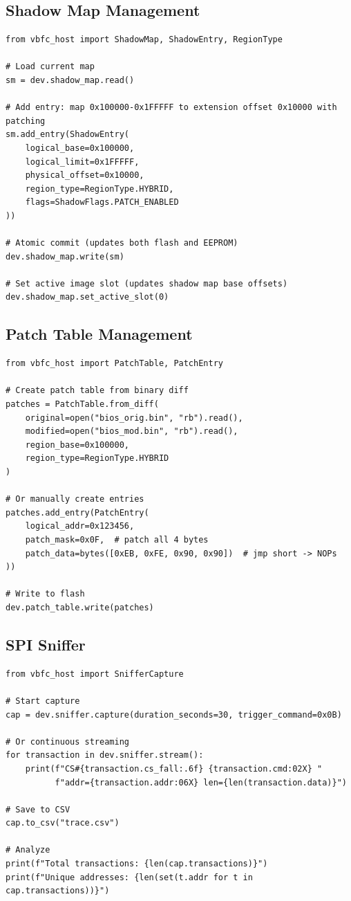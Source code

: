 \subsection{Shadow Map Management}
\begin{lstlisting}[style=vbfcStyle, caption={Shadow Map API}, label={lst:host_shadow}]
from vbfc_host import ShadowMap, ShadowEntry, RegionType

# Load current map
sm = dev.shadow_map.read()

# Add entry: map 0x100000-0x1FFFFF to extension offset 0x10000 with patching
sm.add_entry(ShadowEntry(
    logical_base=0x100000,
    logical_limit=0x1FFFFF,
    physical_offset=0x10000,
    region_type=RegionType.HYBRID,
    flags=ShadowFlags.PATCH_ENABLED
))

# Atomic commit (updates both flash and EEPROM)
dev.shadow_map.write(sm)

# Set active image slot (updates shadow map base offsets)
dev.shadow_map.set_active_slot(0)
\end{lstlisting}

\subsection{Patch Table Management}
\begin{lstlisting}[style=vbfcStyle, caption={Patch Table API}, label={lst:host_patch}]
from vbfc_host import PatchTable, PatchEntry

# Create patch table from binary diff
patches = PatchTable.from_diff(
    original=open("bios_orig.bin", "rb").read(),
    modified=open("bios_mod.bin", "rb").read(),
    region_base=0x100000,
    region_type=RegionType.HYBRID
)

# Or manually create entries
patches.add_entry(PatchEntry(
    logical_addr=0x123456,
    patch_mask=0x0F,  # patch all 4 bytes
    patch_data=bytes([0xEB, 0xFE, 0x90, 0x90])  # jmp short -> NOPs
))

# Write to flash
dev.patch_table.write(patches)
\end{lstlisting}

\subsection{SPI Sniffer}
\begin{lstlisting}[style=vbfcStyle, caption={Sniffer API}, label={lst:host_sniff}]
from vbfc_host import SnifferCapture

# Start capture
cap = dev.sniffer.capture(duration_seconds=30, trigger_command=0x0B)

# Or continuous streaming
for transaction in dev.sniffer.stream():
    print(f"CS#{transaction.cs_fall:.6f} {transaction.cmd:02X} "
          f"addr={transaction.addr:06X} len={len(transaction.data)}")

# Save to CSV
cap.to_csv("trace.csv")

# Analyze
print(f"Total transactions: {len(cap.transactions)}")
print(f"Unique addresses: {len(set(t.addr for t in cap.transactions))}")
\end{lstlisting}

